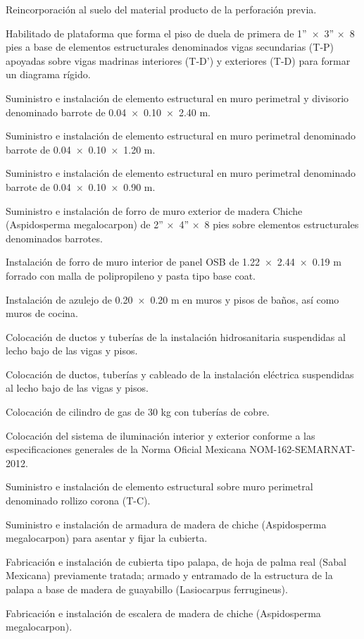 \documentclass{article}
\begin{document}
Reincorporación al suelo del material producto de la perforación previa.

Habilitado de plataforma que forma el piso de duela de primera de 1”~×~3” ×~8 pies a base de elementos estructurales denominados vigas secundarias (T-P) apoyadas sobre vigas madrinas interiores (T-D’) y exteriores (T-D) para formar un diagrama rígido.

Suministro e instalación de elemento estructural en muro perimetral y divisorio denominado barrote de 0.04~×~0.10~×~2.40 m.

Suministro e instalación de elemento estructural en muro perimetral denominado barrote de 0.04~×~0.10~×~1.20 m.

Suministro e instalación de elemento estructural en muro perimetral denominado barrote de 0.04~×~0.10~×~0.90 m.

Suministro e instalación de forro de muro exterior de madera Chiche (Aspidosperma megalocarpon) de 2” ×~4” ×~8 pies sobre elementos estructurales denominados barrotes.

Instalación de forro de muro interior de panel OSB de 1.22~×~2.44~×~0.19 m forrado con malla de polipropileno y pasta tipo base coat.

Instalación de azulejo de 0.20~×~0.20 m en muros y pisos de baños, así como muros de cocina.

Colocación de ductos y tuberías de la instalación hidrosanitaria suspendidas al lecho bajo de las vigas y pisos.

Colocación de ductos, tuberías y cableado de la instalación eléctrica suspendidas al lecho bajo de las vigas y pisos.

Colocación de cilindro de gas de 30 kg con tuberías de cobre.

Colocación del sistema de iluminación interior y exterior conforme a las especificaciones generales de la Norma Oficial Mexicana NOM-162-SEMARNAT-2012.

Suministro e instalación de elemento estructural sobre muro perimetral denominado rollizo corona (T-C).

Suministro e instalación de armadura de madera de chiche (Aspidosperma megalocarpon) para asentar y fijar la cubierta. 

Fabricación e instalación de cubierta tipo palapa, de hoja de palma real (Sabal Mexicana) previamente tratada; armado y entramado de la estructura de la palapa a base de madera de guayabillo (Lasiocarpus ferrugineus).

Fabricación e instalación de escalera de madera de chiche (Aspidosperma megalocarpon).
\end{document}
